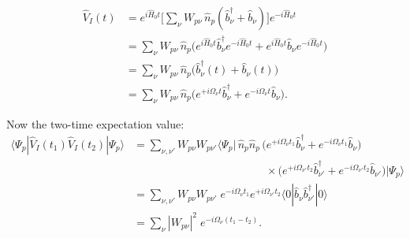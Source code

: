 
\begin{align}
\hat{V}_I(t)
&= e^{i\hat{H}_0 t}\Big[\sum_\nu W_{p\nu}\,\hat{n}_p(\hat{b}_\nu^\dagger+\hat{b}_\nu)\Big]e^{-i\hat{H}_0 t}\\
&= \sum_\nu W_{p\nu}\,\hat{n}_p\Big(
e^{i\hat{H}_0 t}\hat{b}_\nu^\dagger e^{-i\hat{H}_0 t}
+ e^{i\hat{H}_0 t}\hat{b}_\nu e^{-i\hat{H}_0 t}
\Big)\\
&= \sum_\nu W_{p\nu}\,\hat{n}_p\Big(
\hat{b}_\nu^\dagger (t) + \hat{b}_\nu(t)
\Big)\\
&= \sum_\nu W_{p\nu}\,\hat{n}_p\big(
e^{+i\Omega_\nu t}\hat{b}_\nu^\dagger + e^{-i\Omega_\nu t}\hat{b}_\nu
\big).
\end{align}

Now the two-time expectation value:
\begin{align}
\langle \Psi_p|\hat{V}_I(t_1)\hat{V}_I(t_2)|\Psi_p\rangle
&= \sum_{\nu,\nu'} W_{p\nu}W_{p\nu'}
\langle \Psi_p|\,\hat{n}_p\hat{n}_p\,
\big(e^{+i\Omega_\nu t_1}\hat{b}_\nu^\dagger + e^{-i\Omega_\nu t_1}\hat{b}_\nu\big)\nonumber\\
&\qquad\qquad\qquad\qquad\qquad\qquad\times
\big(e^{+i\Omega_{\nu'} t_2}\hat{b}_{\nu'}^\dagger + e^{-i\Omega_{\nu'} t_2}\hat{b}_{\nu'}\big)
|\Psi_p\rangle\nonumber\\
&= \sum_{\nu,\nu'} W_{p\nu}W_{p\nu'}\;
e^{-i\Omega_\nu t_1}e^{+i\Omega_{\nu'} t_2}
\langle 0|\hat{b}_\nu \hat{b}_{\nu'}^\dagger|0\rangle\nonumber\\
&= \sum_{\nu} |W_{p\nu}|^2\;e^{-i\Omega_\nu (t_1-t_2)}.
\end{align}

